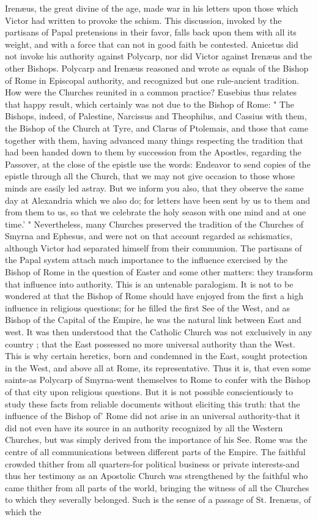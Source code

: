 Irenæus, the great divine of the age, made war in his letters upon those which Victor had written to provoke the schism. This discussion, invoked by the partisans of Papal pretensions in their favor, falls back upon them with all its weight, and with a force that can not in good faith be contested. Anicetus did not invoke his authority against Polycarp, nor did Victor against Irenæus and the other Bishops. Polycarp and Irenæus reasoned and wrote as equals of the Bishop of Rome in Episcopal authority, and recognized but one rule-ancient tradition. How were the Churches reunited in a common practice? Eusebius thus relates that happy result, which certainly was not due to the Bishop of Rome: " The Bishops, indeed, of Palestine, Narcissus and Theophilus, and Cassius with them, the Bishop of the Church at Tyre, and Clarus of Ptolemais, and those that came together with them, having advanced many things respecting the tradition that had been handed down to them by succession from the Apostles, regarding the Passover, at the close of the epistle use the words: Endeavor to send copies of the epistle through all the Church, that we may not give occasion to those whose minds are easily led astray. But we inform you also, that they observe the same day at Alexandria which we also do; for letters have been sent by us to them and from them to us, so that we celebrate the holy season with one mind and at one time.' " Nevertheless, many Churches preserved the tradition of the Churches of Smyrna and Ephesus, and were not on that account regarded as schismatics, although Victor had separated himself from their communion. The partisans of the Papal system attach much importance to the influence exercised by the Bishop of Rome in the question of Easter and some other matters: they transform that influence into authority. This is an untenable paralogism. It is not to be wondered at that the Bishop of Rome should have enjoyed from the first a high influence in religious questions; for he filled the first See of the West, and as Bishop of the Capital of the Empire, he was the natural link between East and west. It was then understood that the Catholic Church was not exclusively in any country ; that the East possessed no more universal authority than the West. This is why certain heretics, born and condemned in the East, sought protection in the West, and above all at Rome, its representative. Thus it is, that even some saints-as Polycarp of Smyrna-went themselves to Rome to confer with the Bishop of that city upon religious questions. But it is not possible conscientiously to study these facts from reliable documents without eliciting this truth: that the influence of the Bishop of' Rome did not arise in an universal authority-that it did not even have its source in an authority recognized by all the Western Churches, but was simply derived from the importance of his See. Rome was the centre of all communications between different parts of the Empire. The faithful crowded thither from all quarters-for political business or private interests-and thus her testimony as an Apostolic Church was strengthened by the faithful who came thither from all parts of the world, bringing the witness of all the Churches to which they severally belonged. Such is the sense of a passage of St. Irenæus, of which the 